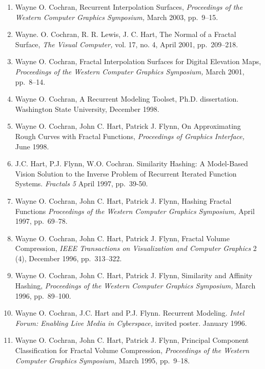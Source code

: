 \documentclass[10pt]{article}
\begin{document}

\begin{enumerate}

\item Wayne O. Cochran,
Recurrent Interpolation Surfaces,
{\em Proceedings of the Western Computer Graphics Symposium,}
March 2003, pp.~9--15.

\item Wayne. O. Cochran, R. R. Lewis, J. C. Hart,
The Normal of a Fractal Surface,
{\em The Visual Computer,} vol. 17, no. 4, April 2001, pp.~209--218.

\item Wayne O. Cochran,
Fractal Interpolation Surfaces for Digital Elevation Maps,
{\em Proceedings of the Western Computer Graphics Symposium,}
March 2001, pp.~8--14.

\item Wayne O. Cochran,
A Recurrent Modeling Toolset, Ph.D. dissertation.
Washington State University, December 1998.

\item
Wayne O. Cochran, John C. Hart, Patrick J. Flynn,
On Approximating Rough Curves with Fractal Functions,
{\em Proceedings of Graphics Interface,}
June 1998.

\item
J.C. Hart, P.J. Flynn, W.O. Cochran. 
Similarity Hashing: A Model-Based Vision Solution to the Inverse 
Problem of Recurrent Iterated Function Systems. 
{\em Fractals 5} April 1997, pp.~39-50.

\item
Wayne O. Cochran, John C. Hart, Patrick J. Flynn,
Hashing Fractal Functions
{\em Proceedings of the Western Computer Graphics Symposium,}
April 1997, pp.~69--78.

\item
Wayne O. Cochran, John C. Hart, Patrick J. Flynn,
Fractal Volume Compression,
{\em IEEE Transactions on Visualization and Computer Graphics}
2 (4),
December 1996, pp.~313--322.

\item
Wayne O. Cochran, John C. Hart, Patrick J. Flynn,
Similarity and Affinity Hashing,
{\em Proceedings of the Western Computer Graphics Symposium,}
March 1996, pp.~89--100.

\item
Wayne O. Cochran, J.C. Hart and P.J. Flynn. Recurrent Modeling. 
{\em Intel Forum: Enabling Live Media in Cyberspace,} 
invited poster. January 1996.

\item
Wayne O. Cochran, John C. Hart, Patrick J. Flynn,
Principal Component Classification for Fractal Volume Compression,
{\em Proceedings of the Western Computer Graphics Symposium,}
March 1995, \mbox{pp.~9--18}.

\end{enumerate}
\end{document}
